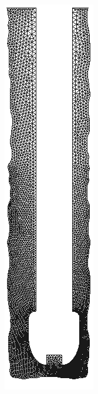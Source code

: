\begin{figure}[H]
\begin{subfigure}[b]{0.1\linewidth}
	\end{subfigure}
	\quad
	\quad
	\quad
	\quad
	\quad
	\begin{subfigure}[b]{0.1\linewidth}
		\includegraphics[width=\linewidth]{img/rugosa_standoff.png}

\end{subfigure}
\end{figure}
